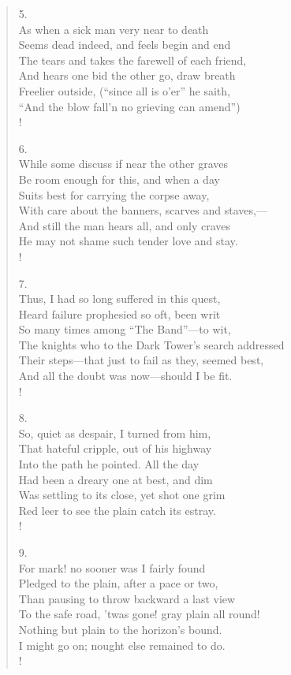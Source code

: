 \documentclass[10pt]{memoir}
\begin{document}
\begin{verse}
5.\\
As when a sick man very near to death\\
\vin Seems dead indeed, and feels begin and end\\
\vin The tears and takes the farewell of each friend,\\
And hears one bid the other go, draw breath\\
Freelier outside, (``since all is o'er'' he saith,\\
\vin ``And the blow fall'n no grieving can amend'')\\!

6.\\
While some discuss if near the other graves\\
\vin Be room enough for this, and when a day\\
\vin Suits best for carrying the corpse away,\\
With care about the banners, scarves and staves,---\\
And still the man hears all, and only craves\\
\vin He may not shame such tender love and stay.\\!

7.\\
Thus, I had so long suffered in this quest,\\
\vin Heard failure prophesied so oft, been writ\\
\vin So many times among ``The Band''---to wit,\\
The knights who to the Dark Tower's search addressed\\
Their steps---that just to fail as they, seemed best,\\
\vin And all the doubt was now---should I be fit.\\!

8.\\
So, quiet as despair, I turned from him,\\
\vin That hateful cripple, out of his highway\\
\vin Into the path he pointed. All the day\\
Had been a dreary one at best, and dim\\
Was settling to its close, yet shot one grim\\
\vin Red leer to see the plain catch its estray.\\!

9.\\
For mark! no sooner was I fairly found\\
\vin Pledged to the plain, after a pace or two,\\
\vin Than pausing to throw backward a last view\\
To the safe road, 'twas gone! gray plain all round!\\
Nothing but plain to the horizon's bound.\\
\vin I might go on; nought else remained to do.\\!


\end{verse}
\end{document}
